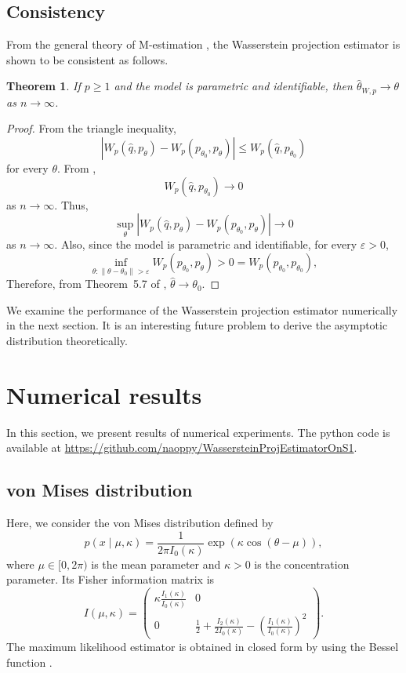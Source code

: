 \documentclass[11pt, a4paper]{article}
\newtheorem{theorem}{Theorem}
\begin{document}
\subsection{Consistency}
From the general theory of M-estimation \cite{vV}, the Wasserstein projection estimator is shown to be consistent as follows.

\begin{theorem}
	If $p \geq 1$ and the model is parametric and identifiable, then $\hat{\theta}_{W,p} \to \theta$ as $n \to \infty$.
\end{theorem}
\begin{proof}
	From the triangle inequality,
	\[
	|W_p(\hat{q},p_{\theta}) - W_p(p_{\theta_0},p_{\theta})| \leq W_p(\hat{q},p_{\theta_0})
	\]
	for every $\theta$.
	From \cite{Fournier},
	\[
	W_p(\hat{q},p_{\theta_0}) \to 0
	\]
	as $n \to \infty$.
	Thus,
	\[
	\sup_{\theta} |W_p(\hat{q},p_{\theta}) - W_p(p_{\theta_0},p_{\theta})| \to 0
	\]
	as $n \to \infty$.
	Also, since the model is parametric and  identifiable, for every $\varepsilon>0$,
	\[
	\inf_{\theta: \| \theta-\theta_0 \| > \varepsilon} W_p(p_{\theta_0},p_{\theta}) > 0 = W_p(p_{\theta_0},p_{\theta_0}),
	\]
	Therefore, from Theorem~5.7 of \cite{vV}, $\hat{\theta} \to \theta_0$.
\end{proof}

We examine the performance of the Wasserstein projection estimator numerically in the next section.
It is an interesting future problem to derive the asymptotic distribution theoretically.

\section{Numerical results}
In this section, we present results of numerical experiments.
The python code is available at \url{https://github.com/naoppy/WassersteinProjEstimatorOnS1}.

\subsection{von Mises distribution}
Here, we consider the von Mises distribution defined by
\[
p(x \mid \mu,\kappa) = \frac{1}{2 \pi I_0(\kappa)}\exp (\kappa \cos (\theta-\mu)),
\]
where $\mu \in [0,2\pi)$ is the mean parameter and $\kappa>0$ is the concentration parameter.
Its Fisher information matrix is
\[
I(\mu,\kappa) = \begin{pmatrix} \kappa \frac{I_1(\kappa)}{I_0(\kappa)} & 0 \\ 0 & \frac{1}{2} + \frac{I_2(\kappa)}{2 I_0(\kappa)} - \left( \frac{I_1(\kappa)}{I_0(\kappa)} \right)^2 \end{pmatrix}.
\]
The maximum likelihood estimator is obtained in closed form by using the Bessel function \cite{Mardia}.
\end{document}
